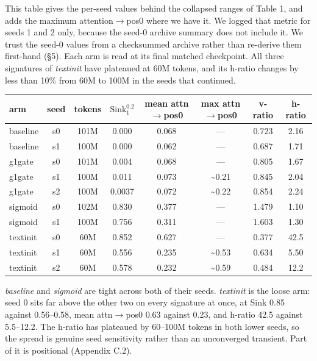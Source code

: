 \documentclass{article}
\begin{document}
This table gives the per-seed values behind the collapsed ranges of Table 1, and adds the maximum attention$\rightarrow$pos0 where we have it. We logged that metric for seeds 1 and 2 only, because the seed-0 archive summary does not include it. We trust the seed-0 values from a checksummed archive rather than re-derive them first-hand (\S5). Each arm is read at its final matched checkpoint. All three signatures of \textit{textinit} have plateaued at 60M tokens, and its h-ratio changes by less than 10\% from 60M to 100M in the seeds that continued.

\begin{table}[t]
  \centering
  \small
  \begin{tabular}{lccccccc}
    \toprule
    arm & seed & tokens & $\mathrm{Sink}^{0.2}_{1}$ & mean attn$\rightarrow$pos0 & max attn$\rightarrow$pos0 & v-ratio & h-ratio \\
    \midrule
    baseline & s0 & 101M & 0.000 & 0.068 & --- & 0.723 & 2.16 \\
    baseline & s1 & 100M & 0.000 & 0.062 & --- & 0.687 & 1.71 \\
    g1gate & s0 & 101M & 0.004 & 0.068 & --- & 0.805 & 1.67 \\
    g1gate & s1 & 100M & 0.011 & 0.073 & \textasciitilde{}0.21 & 0.845 & 2.04 \\
    g1gate & s2 & 100M & 0.0037 & 0.072 & \textasciitilde{}0.22 & 0.854 & 2.24 \\
    sigmoid & s0 & 102M & 0.830 & 0.377 & --- & 1.479 & 1.10 \\
    sigmoid & s1 & 100M & 0.756 & 0.311 & --- & 1.603 & 1.30 \\
    textinit & s0 & 60M & 0.852 & 0.627 & --- & 0.377 & 42.5 \\
    textinit & s1 & 60M & 0.556 & 0.235 & \textasciitilde{}0.53 & 0.634 & 5.50 \\
    textinit & s2 & 60M & 0.578 & 0.232 & \textasciitilde{}0.59 & 0.484 & 12.2 \\
    \bottomrule
  \end{tabular}
\end{table}

\textit{baseline} and \textit{sigmoid} are tight across both of their seeds. \textit{textinit} is the loose arm: seed 0 sits far above the other two on every signature at once, at Sink 0.85 against 0.56--0.58, mean attn$\rightarrow$pos0 0.63 against 0.23, and h-ratio 42.5 against 5.5--12.2. The h-ratio has plateaued by 60--100M tokens in both lower seeds, so the spread is genuine seed sensitivity rather than an unconverged transient. Part of it is positional (Appendix C.2).
\end{document}
